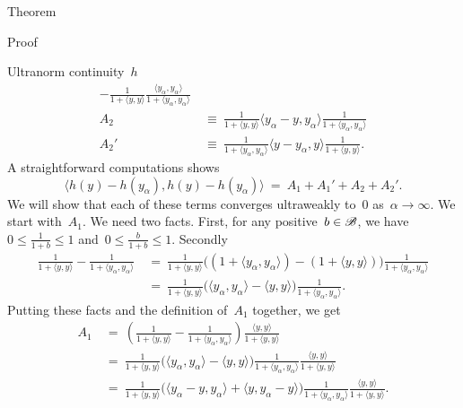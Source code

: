 \begin{parsec}
\begin{point}{Theorem}
\begin{point}{Proof}
\begin{point}{Ultranorm continuity~$h$}
\begin{align*}
    - \frac{1}{1+\langle y,y \rangle}
    \frac{\langle y_\alpha,y_\alpha\rangle}{1+\langle y_\alpha,y_\alpha \rangle} \\
    A_2 & \ \equiv \ 
    \frac{1}{1+ \langle y,y \rangle}
       \langle y_\alpha- y, y_\alpha\rangle
     \frac{1}{1+ \langle y_\alpha,y_\alpha \rangle} \\
    A_2' & \ \equiv \  \frac{1}{1+ \langle y_\alpha,y_\alpha \rangle}
       \langle y- y_\alpha, y\rangle
     \frac{1}{1+ \langle y,y \rangle}.
\end{align*}
A straightforward computations shows
\begin{equation}\label{kaplansky-splitting}
    \langle h(y) - h(y_\alpha) ,
         h(y) - h(y_\alpha) \rangle  \ = \ A_1 + A_1' + A_2 + A_2'.
\end{equation}
We will show that each of these terms converges ultraweakly to~$0$
 as~$\alpha \to \infty$.
We start with~$A_1$.
We need two facts.
First, for any positive~$b \in \mathscr{B}$, we have~$0 \leq \frac{1}{1+b} \leq 1$
and~$0 \leq \frac{b}{1+b} \leq 1$.
Secondly
\begin{align*}
    \frac{1}{1+\langle y,y\rangle }
        -
    \frac{1}{1+\langle y_\alpha,y_\alpha\rangle }
    & \ = \ 
    \frac{1}{1+\langle y,y\rangle }
    \bigl((1+\langle y_\alpha,y_\alpha \rangle) - (1+\langle y,y \rangle)\bigr) 
    \frac{1}{1+\langle y_\alpha,y_\alpha\rangle }\\
    & \ = \ 
    \frac{1}{1+\langle y,y\rangle }
   \bigl(\langle y_\alpha,y_\alpha \rangle - \langle y,y \rangle\bigr) 
    \frac{1}{1+\langle y_\alpha,y_\alpha\rangle }.
\end{align*}
Putting these facts and the definition of~$A_1$ together, we get
\begin{align*}
     A_1 
    &\ = \ 
    \left(
    \frac{1}{1+\langle y,y\rangle } -
    \frac{1}{1+\langle y_\alpha,y_\alpha\rangle }\right)
            \frac{\langle y,y \rangle}{1+\langle y,y \rangle} \\
    &\ = \ 
    \frac{1}{1+\langle y,y\rangle }
   \bigl(\langle y_\alpha,y_\alpha \rangle - \langle y,y \rangle\bigr) 
    \frac{1}{1+\langle y_\alpha,y_\alpha\rangle }
            \frac{\langle y,y \rangle}{1+\langle y,y \rangle} \\
    &\ = \ 
    \frac{1}{1+\langle y,y\rangle }
   \bigl(\langle y_\alpha -y,y_\alpha \rangle + \langle y,y_\alpha - y \rangle\bigr) 
    \frac{1}{1+\langle y_\alpha,y_\alpha\rangle }
            \frac{\langle y,y \rangle}{1+\langle y,y \rangle}.
\end{align*}

\end{point}
\end{point}
\end{point}
\end{parsec}
